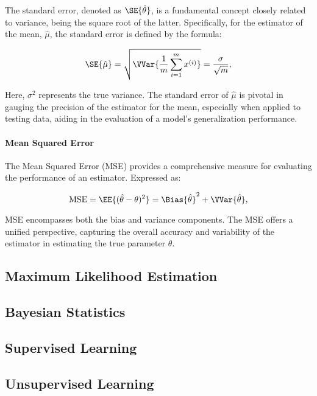             The standard error, denoted as $\SE{\hat{\theta}}$, is a fundamental concept closely related to variance, being the square root of the latter. Specifically, for the estimator of the mean, $\hat{\mu}$, the standard error is defined by the formula:

            \begin{equation}
                \SE{\hat{\mu}} = \sqrt{\VVar{\frac{1}{m}\sum_{i=1}^m x^{(i)}}} = \frac{\sigma}{\sqrt{m}},
            \end{equation}

            Here, $\sigma^2$ represents the true variance. The standard error of $\hat{\mu}$ is pivotal in gauging the precision of the estimator for the mean, especially when applied to testing data, aiding in the evaluation of a model's generalization performance.

        \paragraph{Mean Squared Error}

            The Mean Squared Error (MSE) provides a comprehensive measure for evaluating the performance of an estimator. Expressed as:

            \begin{equation}
                \text{MSE} = \EE{(\hat{\theta}-\theta)^2} = \Bias{\hat{\theta}}^2 + \VVar{\hat{\theta}},
            \end{equation}

            MSE encompasses both the bias and variance components. The MSE offers a unified perspective, capturing the overall accuracy and variability of the estimator in estimating the true parameter $\theta$.


    \subsection{Maximum Likelihood Estimation}
            
    \subsection{Bayesian Statistics}
    \subsection{Supervised Learning}
    \subsection{Unsupervised Learning}
